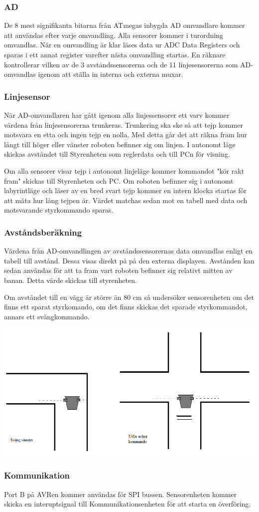 \subsubsection{AD}
De 8 mest signifikanta bitarna från ATmegas inbygda AD omvandlare kommer att användas efter varje omvandling. Alla sensorer kommer i turordning omvandlas. När en omvandling är klar läses data ur ADC Data Registers och sparas i ett annat register varefter nästa omvandling startas. En räknare kontrollerar vilken av de 3 avståndssensorerna och de 11 linjesensorerna som AD-omvandlas igenom att ställa in interna och externa muxar.

\subsubsection{Linjesensor}
När AD-omvandlaren har gått igenom alla linjessensorer ett varv kommer värdena från linjesensorerna trunkeras. Trunkering ska ske så att tejp kommer motsvara en etta och ingen tejp en nolla. Med detta går det att räkna fram hur långt till höger eller vänster roboten befinner sig om linjen. I autonomt läge skickas avståndet till Styrenheten som reglerdata och till PCn för visning.

Om alla sensorer visar tejp i autonomt linjeläge kommer kommandot "kör rakt fram" skickas till Styrenheten och PC.
Om roboten befinner sig i autonomt labyrintläge och läser av en bred svart tejp kommer en intern klocka startas för att mäta hur lång tejpen är. Värdet matchas sedan mot en tabell med data och motsvarande styrkommando sparas.

\subsubsection{Avståndsberäkning}
Värdena från AD-omvandlingen av avståndssensorernas data omvandlas enligt en tabell till avstånd. Dessa visas direkt på på den externa displayen. Avstånden kan sedan användas för att ta fram vart roboten befinner sig relativt mitten av banan. Detta värde skickas till styrenheten.

Om avståndet till en vägg är större än 80 cm så undersöker sensorenheten om det finns ett sparat styrkomando, om det finns skickas det sparade styrkommandot, annars ett svängkommando.

\includegraphics[angle=0,scale=0.5]{bilder/labkors.png}

\subsubsection{Kommunikation}
Port B på AVRen kommer användas för SPI bussen. Sensorenheten kommer skicka en interuptsignal till Kommunikationsenheten för att starta en överföring.

